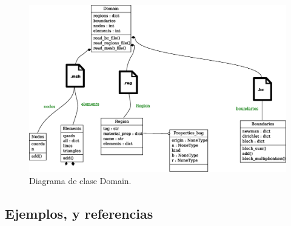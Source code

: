 \documentclass[xcolor=table,serif,handout]{beamer}
\begin{document}
{{\begin{figure}
			\centering
			\includegraphics[scale=0.3]{classes_reduced_3.eps}
			\caption{Diagrama de clase Domain.}
			\end{figure}		
		}
	}
	\subsection{Ejemplos, y referencias}
\end{document}
